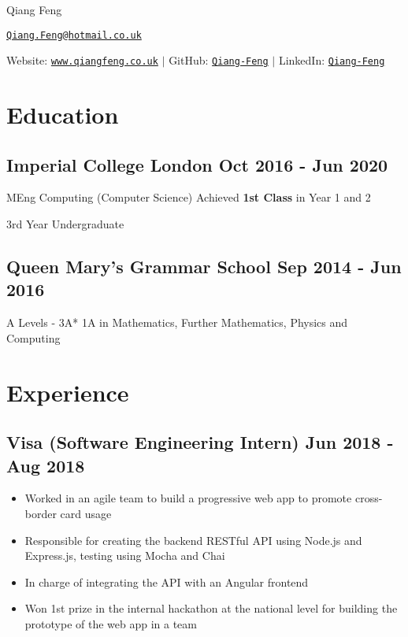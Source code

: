 \documentclass[a4paper]{article}
\begin{document}
\begin{center}
    {\huge Qiang Feng}

    \vspace{2pt}

    \href{mailto:Qiang.Feng@hotmail.co.uk}{\texttt{Qiang.Feng@hotmail.co.uk}}

    \vspace{2pt}

    Website: \href{https://www.qiangfeng.co.uk}{\texttt{www.qiangfeng.co.uk}} $\mid$
    GitHub: \href{https://github.com/Qiang-Feng}{\texttt{Qiang-Feng}} $\mid$
    LinkedIn: \href{https://www.linkedin.com/in/qiang-feng/}{\texttt{Qiang-Feng}}
\end{center}

\section*{Education}

\subsection*{Imperial College London \hfill Oct 2016 - Jun 2020}

MEng Computing (Computer Science) \hfill Achieved \textbf{1st Class} in Year 1 and 2

3rd Year Undergraduate

\subsection*{Queen Mary's Grammar School \hfill Sep 2014 - Jun 2016}

A Levels - 3A* 1A in Mathematics, Further Mathematics, Physics and Computing

\section*{Experience}

\subsection*{Visa \textnormal{(Software Engineering Intern)} \hfill Jun 2018 - Aug 2018}

\begin{itemize}
    \item Worked in an agile team to build a progressive web app to promote cross-border card usage
    \item Responsible for creating the backend RESTful API using Node.js and Express.js, testing using Mocha and Chai
    \item In charge of integrating the API with an Angular frontend
    \item Won 1st prize in the internal hackathon at the national level for building the prototype of the web app in a team
\end{itemize}
\end{document}
